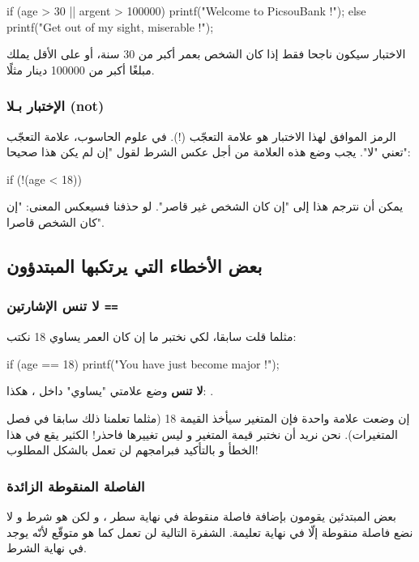 \begin{Csource}
if (age > 30 || argent > 100000)
{
	printf("Welcome to PicsouBank !");
}
else
{
	printf("Get out of my sight, miserable !");
}
\end{Csource}

الاختبار سيكون ناجحا فقط إذا كان الشخص بعمر أكبر من 30 سنة، أو على الأقل يملك مبلغًا أكبر من 100000 دينار مثلًا.

\subsubsection{الإختبار بـلا (\textenglish{not})}

الرمز الموافق لهذا الاختبار هو علامة التعجّب (!). في علوم الحاسوب، علامة التعجّب تعني "لا". يجب  وضع هذه العلامة من أجل عكس الشرط لقول  "إن لم يكن هذا صحيحا":
\begin{Csource}
if (!(age < 18))
\end{Csource}

يمكن أن نترجم هذا إلى "إن كان الشخص غير قاصر". لو حذفنا
\InlineCode{!}
فسيعكس المعنى: "إن كان الشخص قاصرا".
\subsection{بعض الأخطاء التي يرتكبها المبتدؤون}

\subsubsection{لا تنس الإشارتين \texttt{==}}

مثلما قلت سابقا، لكي نختبر ما إن كان العمر يساوي 18 نكتب:

\begin{Csource}
if (age == 18)
{
	printf("You have just become major !");
}
\end{Csource}

\textbf{لا تنس}
وضع علامتي "يساوي" داخل
،
هكذا:
\InlineCode{==}.

إن وضعت علامة
\InlineCode{=}
واحدة فإن المتغير
سيأخذ القيمة 18 (مثلما تعلمنا ذلك سابقا في فصل المتغيرات). نحن نريد أن نختبر قيمة المتغير و ليس تغييرها فاحذر! الكثير يقع في هذا الخطأ و بالتأكيد فبرامجهم لن تعمل بالشكل المطلوب!

\subsubsection{الفاصلة المنقوطة الزائدة}

بعض المبتدئين يقومون بإضافة فاصلة منقوطة في نهاية سطر ، و لكن  هو شرط و لا نضع فاصلة منقوطة إلّا في نهاية تعليمة. الشفرة التالية لن تعمل كما هو متوقّع لأنّه يوجد
\InlineCode{;}
في نهاية الشرط.

